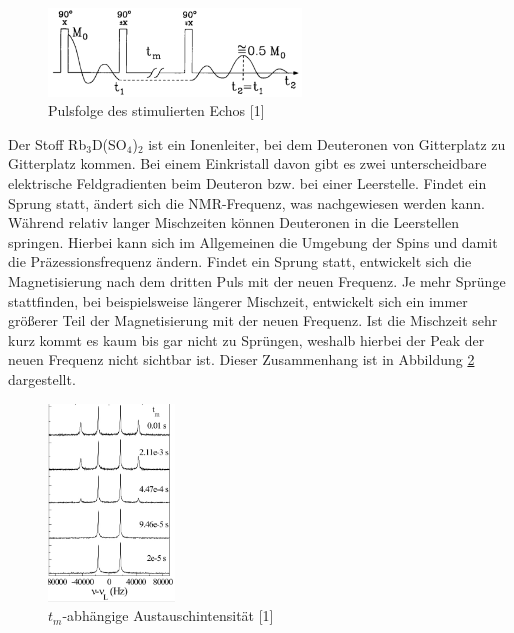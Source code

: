 \begin{figure}[H]
 \includegraphics[width=0.6\textwidth]{../pics/stimEchoFolge.jpg}
 \caption{Pulsfolge des stimulierten Echos [1]}
 \label{pic_stimEchoFolge}
\end{figure}
\noindent
Der Stoff Rb$_3$D(SO$_4$)$_2$ ist ein Ionenleiter, bei dem Deuteronen von Gitterplatz zu Gitterplatz kommen. Bei einem Einkristall davon gibt es zwei
unterscheidbare elektrische Feldgradienten beim Deuteron bzw. bei einer Leerstelle. Findet ein Sprung statt, ändert sich die NMR-Frequenz, was nachgewiesen
werden kann. Während relativ langer Mischzeiten können Deuteronen in die Leerstellen springen. Hierbei kann sich im Allgemeinen 
die Umgebung der Spins und damit die Präzessionsfrequenz ändern. Findet ein Sprung statt, entwickelt sich die Magnetisierung nach dem dritten Puls mit der
neuen Frequenz. Je mehr Sprünge stattfinden, bei beispielsweise längerer Mischzeit, entwickelt sich ein immer größerer Teil der Magnetisierung mit der 
neuen Frequenz. Ist die Mischzeit sehr kurz kommt es kaum bis gar nicht zu Sprüngen, weshalb hierbei der Peak der neuen Frequenz nicht sichtbar ist.
Dieser Zusammenhang ist in Abbildung \ref{pic_neueFrequenz} dargestellt. 
\begin{figure}[H]
 \includegraphics[width=0.3\textwidth]{../pics/neueFrequenz.jpg}
 \caption{$t_m$-abhängige Austauschintensität [1]}
 \label{pic_neueFrequenz}
\end{figure}
